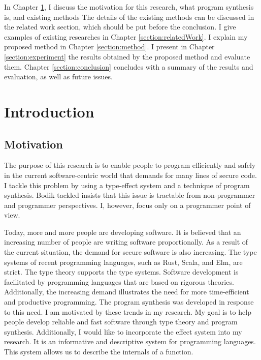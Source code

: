 \documentclass[12pt, a4paper, titlepage]{report}
\begin{document}
In Chapter \ref{section:introduction}, I discuss the motivation for this research, what program synthesis is, and existing methods  The details of the existing methods can be discussed in the related work section, which should be  put before the conclusion.
I give examples of existing researches in Chapter \ref{section:relatedWork}.
I explain my proposed method in Chapter \ref{section:method}.
I present in Chapter \ref{section:experiment} the results obtained by the proposed method and evaluate them.
Chapter \ref{section:conclusion} concludes with a summary of the results and evaluation, as well as future issues.

\chapter{Introduction}\label{section:introduction}
 
  \section{Motivation}
    The purpose of this research is to enable people to program efficiently and safely in the current software-centric world that demands for many lines of secure code.
    I tackle this problem by using a type-effect system and a technique of program synthesis.
    Bodik tackled insists that this issue is tractable from non-programmer and programmer perspectives. \cite{bodik:2015}
    I, however, focus only on a programmer point of view.

    Today, more and more people are developing software.
    It is believed that an increasing number of people are writing software proportionally.
    As a result of the current situation, the demand for secure software is also increasing.
    The type systems of recent programming languages, such as Rust, Scala, and Elm, are strict.
    The type theory supports the type systems.
    Software development is facilitated by programming languages that are based on rigorous theories.
    Additionally, the increasing demand illustrates the need for more time-efficient and productive programming.
    The program synthesis was developed in response to this need.
    I am motivated by these trends in my research.
    My goal is to help people develop reliable and fast software through type theory and program synthesis.
    Additionally, I would like to incorporate the effect system into my research.
    It is an informative and descriptive system for programming languages.
    This system allows us to describe the internals of a function.
\end{document}
